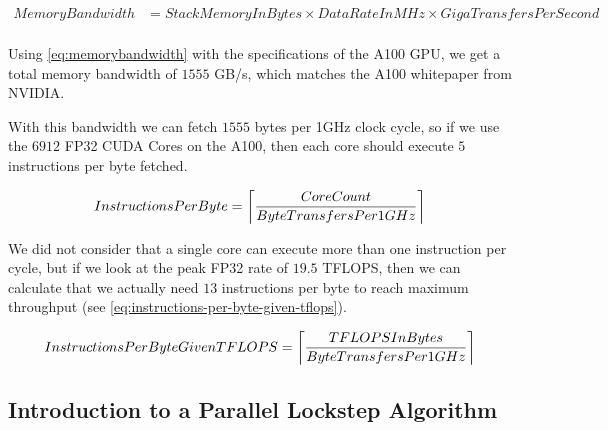\begin{equation}
\begin{split}
        MemoryBandwidth &= StackMemoryInBytes \times DataRateInMHz \times GigaTransfersPerSecond\label{eq:memorybandwidth}\\
\end{split}
\end{equation}

Using \autoref{eq:memorybandwidth} with the specifications of the A100 GPU, we get a total memory bandwidth of $1555$ GB/s, which matches the A100 whitepaper from NVIDIA\cite{nvidia-a100-architecture}.

With this bandwidth we can fetch $1555$ bytes per 1GHz clock cycle, so if we use the $6912$ FP32 CUDA Cores on the A100, then each core should execute $5$ instructions per byte fetched.

\begin{equation}
\begin{split}
        InstructionsPerByte &= \ceil*{\frac{CoreCount}{ByteTransfersPer1GHz}}\\
\end{split}
\end{equation}

We did not consider that a single core can execute more than one instruction per cycle, but if we look at the peak FP32 rate of $19.5$ TFLOPS, then we can calculate that we actually need $13$ instructions per byte to reach maximum throughput (see \autoref{eq:instructions-per-byte-given-tflops}).

\begin{equation}
\begin{split}
        InstructionsPerByteGivenTFLOPS &= \ceil*{\frac{TFLOPSInBytes}{ByteTransfersPer1GHz}}\label{eq:instructions-per-byte-given-tflops}\\
\end{split}
\end{equation}




\subsection{Introduction to a Parallel Lockstep Algorithm}

